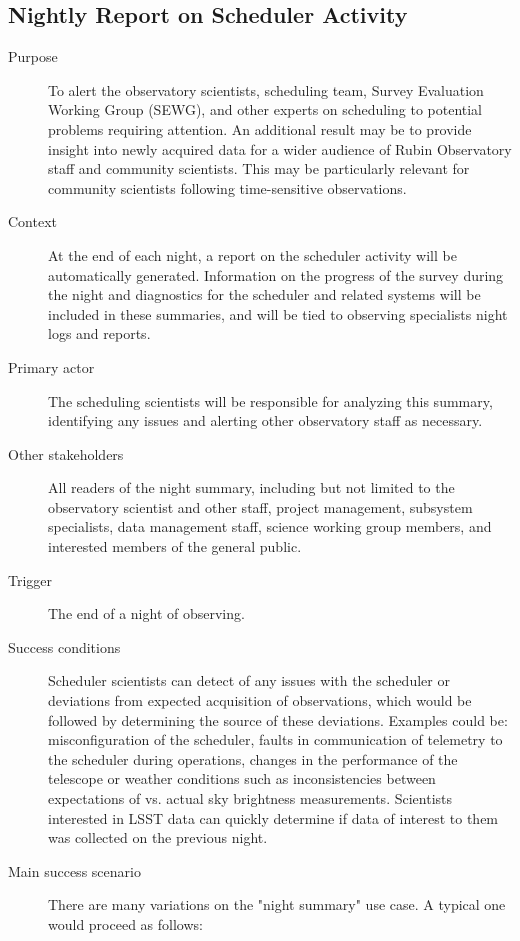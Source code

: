 \subsection{Nightly Report on Scheduler Activity}
\label{sec:orgd13eff4}
\begin{description}
\item[{Purpose}] To alert the observatory scientists,  scheduling team, Survey Evaluation Working Group (SEWG), and other experts on scheduling to potential problems requiring attention. An additional result may be to provide insight into newly acquired data for a wider audience of Rubin Observatory staff and community scientists. This may be particularly relevant for community scientists following time-sensitive observations.
\item[{Context}] At the end of each night, a report on the scheduler activity will be automatically generated. Information on the progress of the survey during the night and diagnostics for the scheduler and related systems will be included in these summaries, and will be tied to observing specialists night logs and reports. 
\item[{Primary actor}] The scheduling scientists will be responsible for analyzing this summary, identifying any issues and alerting other observatory staff as necessary.
\item[{Other stakeholders}] All readers of the night summary, including but not limited to the observatory scientist and other staff, project management, subsystem specialists, data management staff, science working group members, and interested members of the general public.
\item[{Trigger}] The end of a night of observing.
\item[{Success conditions}]  Scheduler scientists can detect of any issues with the scheduler or deviations from expected acquisition of observations, which would be followed by determining the source of these deviations. Examples could be:  misconfiguration of the scheduler, faults in communication of telemetry to the scheduler during operations, changes in the performance of the telescope or weather conditions such as inconsistencies between expectations of vs. actual sky brightness measurements. Scientists interested in LSST data can quickly determine if data of interest to them was collected on the previous night. 
\item[{Main success scenario}] There are many variations on the "night summary" use case. A typical one would proceed as follows:
\begin{enumerate}

\end{enumerate}
\end{description}
